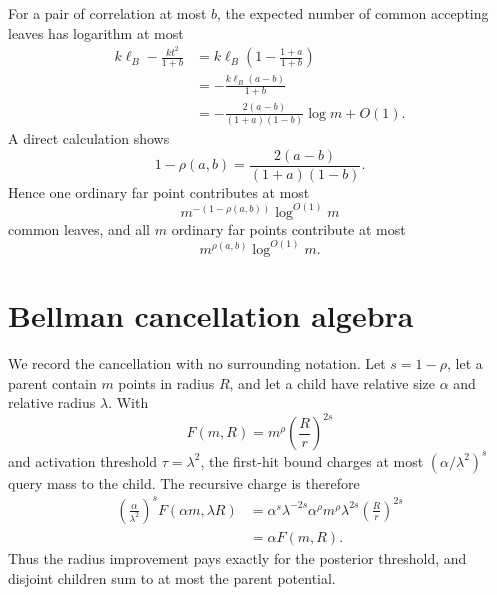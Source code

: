 \documentclass[10pt]{article}
\theoremstyle{definition}
\begin{document}
For a pair of correlation at most $b$, the expected number of common accepting leaves has logarithm at most
\begin{align*}
   k\ell_B-\frac{kt^2}{1+b}
                                                                                                                  &=
                                                                                                                  k\ell_B\left(1-\frac{1+a}{1+b}\right)\\
                                                                                                                                                                                                 &=-\frac{k\ell_B(a-b)}{1+b}\\
                                                                                                                                                                                                                                                                                                                                                                                                                                                                                                                                                                                                                                                                                           &=-\frac{2(a-b)}{(1+a)(1-b)}\log m+O(1).
\end{align*}
A direct calculation shows
\[
   1-\rho(a,b)
   =
   \frac{2(a-b)}{(1+a)(1-b)}.
\]
Hence one ordinary far point contributes at most
\[
   m^{-(1-\rho(a,b))}\log^{O(1)}m
\]
common leaves, and all $m$ ordinary far points contribute at most
\[
   m^{\rho(a,b)}\log^{O(1)}m.
\]

\section{Bellman cancellation algebra}

We record the cancellation with no surrounding notation. Let $s=1-\rho$, let a parent contain $m$ points in radius $R$, and let a child have relative size $\alpha$ and relative radius $\lambda$. With
\[
   F(m,R)=m^\rho\left(\frac Rr\right)^{2s}
\]
and activation threshold $\tau=\lambda^2$, the first-hit bound charges at most $(\alpha/\lambda^2)^s$ query mass to the child. The recursive charge is therefore
\begin{align*}
   \left(\frac{\alpha}{\lambda^2}\right)^s
   F(\alpha m,\lambda R)
   &=
   \alpha^s\lambda^{-2s}
   \alpha^\rho m^\rho
   \lambda^{2s}\left(\frac Rr\right)^{2s}\\
   &=
   \alpha F(m,R).
\end{align*}
Thus the radius improvement pays exactly for the posterior threshold, and disjoint children sum to at most the parent potential.
\end{document}

